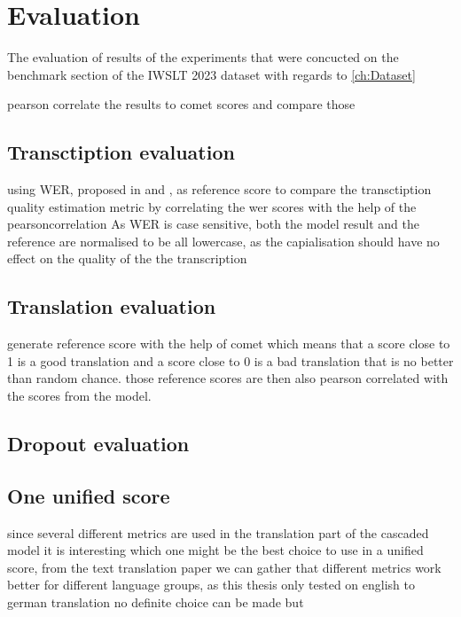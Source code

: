 
\chapter{Evaluation}
\label{ch:Evaluation}
The evaluation of results of the experiments that were concucted on the benchmark section of the IWSLT 2023 dataset \cite{sperber2024evaluating} with regards to \ref{ch:Dataset}

pearson correlate \cite{2020SciPy-NMeth} the results to comet scores and compare those 


\section{Transctiption evaluation}


using WER, proposed in \cite{woodard1982} and \cite{morris2004}, as reference score to compare the transctiption quality estimation metric by correlating the wer scores with the help of the pearsoncorrelation \cite{2020SciPy-NMeth}
As WER is case sensitive, both the model result and the reference are normalised to be all lowercase, as the capialisation should have no effect on the quality of the the transcription

\section{Translation evaluation}

generate reference score with the help of comet \cite{rei-etal-2020-comet} which means that a score close to 1 is a good translation and a score close to 0 is a bad translation that is no better than random chance.
those reference scores are then also pearson correlated with the scores from the model. 

\section{Dropout evaluation}


\section{One unified score}
since several different metrics are used in the translation part of the cascaded model it is interesting which one might be the best choice to use in a unified score, from the text translation paper \cite{fomicheva2020unsupervised} we can gather that different metrics work better for different language groups, as this thesis only tested on english to german translation no definite choice can be made but %



